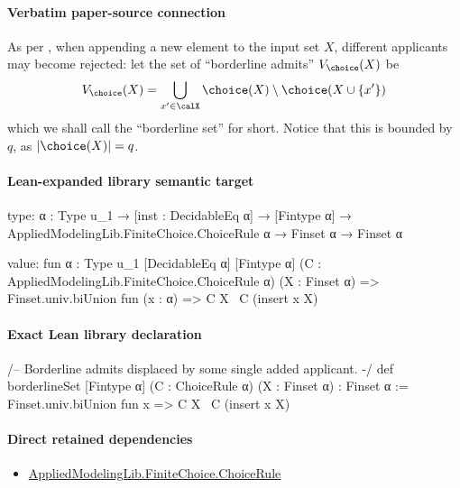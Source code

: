 \documentclass[10pt]{article}
\begin{document}
\paragraph{Verbatim paper-source connection}
\begin{ReviewVerbatim}
As per , when appending a new element to the input set $X$, different applicants may become rejected: let the set of ``borderline admits'' $V_\choice(X)$ be
\begin{equation}
V_\choice(X) = \bigcup\limits_{x'\in\calX} \choice(X) \setminus \choice(X \cup \{x'\})
\end{equation}
which we shall call the ``borderline set'' for short. Notice that this is bounded by $q$, as $|\choice(X)| = q$.
\end{ReviewVerbatim}



\paragraph{Lean-expanded library semantic target}
\begin{ReviewVerbatim}
type:
{α : Type u_1} →
  [inst : DecidableEq α] → [Fintype α] → AppliedModelingLib.FiniteChoice.ChoiceRule α → Finset α → Finset α

value:
fun {α : Type u_1} [DecidableEq α] [Fintype α] (C : AppliedModelingLib.FiniteChoice.ChoiceRule α) (X : Finset α) =>
  Finset.univ.biUnion fun (x : α) => C X \ C (insert x X)
\end{ReviewVerbatim}

\paragraph{Exact Lean library declaration}
\begin{ReviewVerbatim}
/-- Borderline admits displaced by some single added applicant. -/
def borderlineSet [Fintype α] (C : ChoiceRule α) (X : Finset α) : Finset α :=
  Finset.univ.biUnion fun x => C X \ C (insert x X)
\end{ReviewVerbatim}

\paragraph{Direct retained dependencies}
\begin{itemize}\raggedright
\item \hyperlink{library-prerequisite-5dea5c3766008208}{Applied\allowbreak{}Modeling\allowbreak{}Lib.\allowbreak{}Finite\allowbreak{}Choice.\allowbreak{}Choice\allowbreak{}Rule}
\end{itemize}
\end{document}
